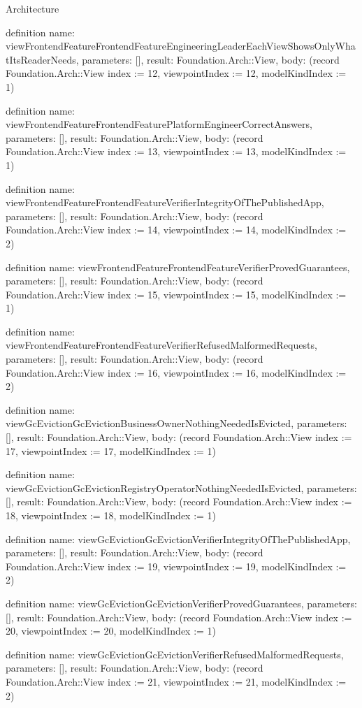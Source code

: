 \begin{lexlean}{Architecture}
\begin{semanticmodule}
definition{
  name: viewFrontendFeatureFrontendFeatureEngineeringLeaderEachViewShowsOnlyWhatItsReaderNeeds,
  parameters: [],
  result: Foundation.Arch::View,
  body: (record Foundation.Arch::View {index := 12, viewpointIndex := 12, modelKindIndex := 1})
}

definition{
  name: viewFrontendFeatureFrontendFeaturePlatformEngineerCorrectAnswers,
  parameters: [],
  result: Foundation.Arch::View,
  body: (record Foundation.Arch::View {index := 13, viewpointIndex := 13, modelKindIndex := 1})
}

definition{
  name: viewFrontendFeatureFrontendFeatureVerifierIntegrityOfThePublishedApp,
  parameters: [],
  result: Foundation.Arch::View,
  body: (record Foundation.Arch::View {index := 14, viewpointIndex := 14, modelKindIndex := 2})
}

definition{
  name: viewFrontendFeatureFrontendFeatureVerifierProvedGuarantees,
  parameters: [],
  result: Foundation.Arch::View,
  body: (record Foundation.Arch::View {index := 15, viewpointIndex := 15, modelKindIndex := 1})
}

definition{
  name: viewFrontendFeatureFrontendFeatureVerifierRefusedMalformedRequests,
  parameters: [],
  result: Foundation.Arch::View,
  body: (record Foundation.Arch::View {index := 16, viewpointIndex := 16, modelKindIndex := 2})
}

definition{
  name: viewGcEvictionGcEvictionBusinessOwnerNothingNeededIsEvicted,
  parameters: [],
  result: Foundation.Arch::View,
  body: (record Foundation.Arch::View {index := 17, viewpointIndex := 17, modelKindIndex := 1})
}

definition{
  name: viewGcEvictionGcEvictionRegistryOperatorNothingNeededIsEvicted,
  parameters: [],
  result: Foundation.Arch::View,
  body: (record Foundation.Arch::View {index := 18, viewpointIndex := 18, modelKindIndex := 1})
}

definition{
  name: viewGcEvictionGcEvictionVerifierIntegrityOfThePublishedApp,
  parameters: [],
  result: Foundation.Arch::View,
  body: (record Foundation.Arch::View {index := 19, viewpointIndex := 19, modelKindIndex := 2})
}

definition{
  name: viewGcEvictionGcEvictionVerifierProvedGuarantees,
  parameters: [],
  result: Foundation.Arch::View,
  body: (record Foundation.Arch::View {index := 20, viewpointIndex := 20, modelKindIndex := 1})
}

definition{
  name: viewGcEvictionGcEvictionVerifierRefusedMalformedRequests,
  parameters: [],
  result: Foundation.Arch::View,
  body: (record Foundation.Arch::View {index := 21, viewpointIndex := 21, modelKindIndex := 2})
}


\end{semanticmodule}
\end{lexlean}
